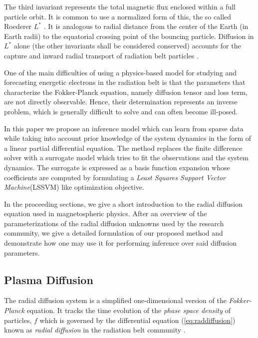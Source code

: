 The third invariant represents the total magnetic flux enclosed within 
a full particle orbit. It is common to use a normalized form of this, the 
so called Roederer $L^{*}$ \citep{Roederer1970}. It is analogous to radial 
distance from the center of the Earth (in Earth radii) to the equatorial 
crossing point of the bouncing particle. Diffusion in $L^{*}$ alone 
(the other invariants shall be considered conserved) accounts for the
capture and inward radial transport of radiation belt particles 
\citep{Roederer1970,JGR:JGR4463}.

One of the main difficulties of using a physics-based model for studying and 
forecasting energetic electrons in the radiation belt is that the parameters 
that characterize the Fokker-Planck equation, namely diffusion tensor and loss term,
are not directly observable. Hence, their determination represents an inverse problem,
which is generally difficult to solve and can often become ill-posed.

In this paper we propose an inference model which can learn from sparse
data while taking into account prior knowledge of the system dynamics
in the form of a linear partial differential equation. The method replaces
the finite difference solver with a surrogate model which tries to fit
the observations and the system dynamics. The surrogate is expressed as
a basis function expansion whose coefficients are computed by formulating
a \emph{Least Squares Support Vector Machine}(LSSVM) like optimization
objective.

In the proceeding sections, we give a short introduction to the radial 
diffusion equation used in magnetospheric physics. After an overview of 
the parameterizations of the radial diffusion unknowns used by the research community, 
we give a detailed formulation of our proposed method and demonstrate 
how one may use it for performing inference over said diffusion parameters.

\subsection{Plasma Diffusion}

The radial diffusion system is a simplified one-dimensional version of
the \emph{Fokker-Planck} equation. It tracks the time evolution of the
\emph{phase space density} of particles, $f$ which is governed by the
differential equation (\ref{eq:raddiffusion}) known as \emph{radial
  diffusion} in the radiation belt community \citep{JGRA:JGRA9345}.

